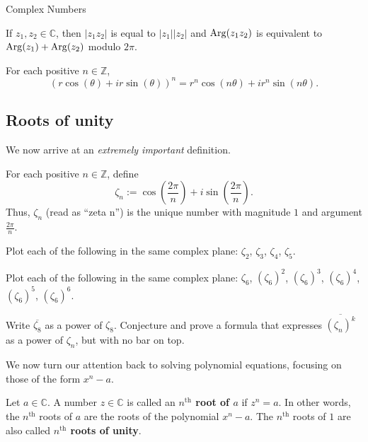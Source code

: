 \begin{section}{Complex Numbers}
\begin{corollary}
If $z_1,z_2\in \mathbb{C}$, then $|z_1z_2|$ is equal to $|z_1||z_2|$ and $\operatorname{Arg}(z_1z_2)$ is equivalent to $\operatorname{Arg}(z_1)+\operatorname{Arg}(z_2)$ modulo $2\pi$.
\end{corollary}

\begin{corollary}\label{cor.DeMoivre}
For each positive $n\in \mathbb{Z}$, \[\left(r\cos(\theta) + ir\sin(\theta)\right)^n = r^n\cos(n\theta) + ir^n\sin(n\theta).\]
\end{corollary}

\subsection{Roots of unity}
We now arrive at an \emph{extremely important} definition.

\begin{definition}
For each positive $n\in \mathbb{Z}$, define \[\zeta_n := \cos\left(\frac{2\pi}{n}\right) + i\sin\left(\frac{2\pi}{n}\right).\]
Thus, $\zeta_n$ (read as ``zeta n'') is the unique  number with magnitude $1$ and argument $\frac{2\pi}{n}$.
\end{definition}

\begin{problem}
Plot each of the following in the same complex plane: $\zeta_2$, $\zeta_3$, $\zeta_4$, $\zeta_5$.
\end{problem}

\begin{problem}
Plot each of the following in the same complex plane: $\zeta_6$, $(\zeta_6)^2$, $(\zeta_6)^3$, $(\zeta_6)^4$, $(\zeta_6)^5$, $(\zeta_6)^6$.
\end{problem}

\begin{problem}
Write $\overline{\zeta_8}$ as a power of $\zeta_8$. Conjecture and prove a formula that expresses $\overline{(\zeta_n)^k}$ as a power of $\zeta_n$, but with no bar on top.
\end{problem}

We now turn our attention back to solving polynomial equations, focusing on those of the form $x^n - a$.

\begin{definition}\label{def.nthRoot}
Let $a\in \mathbb{C}$. A number $z\in \mathbb{C}$ is called an \textbf{$n^\text{th}$ root of $a$} if $z^n = a$. In other words, the  $n^\text{th}$ roots of $a$ are the roots of the polynomial $x^n-a$. The  $n^\text{th}$ roots of $1$ are also called \textbf{$n^\text{th}$ roots of unity}.
\end{definition}


\end{section}
